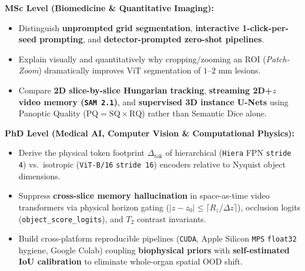 \documentclass[10.5pt,a4paper]{article}
\begin{document}
\begin{infobox}
\textbf{MSc Level (Biomedicine \& Quantitative Imaging):}
\begin{itemize}
    \item Distinguish \textbf{unprompted grid segmentation}, \textbf{interactive 1-click-per-seed prompting}, and \textbf{detector-prompted zero-shot pipelines}.
    \item Explain visually and quantitatively why cropping/zooming an ROI (\emph{Patch-Zoom}) dramatically improves ViT segmentation of $1\text{--}2\text{ mm}$ lesions.
    \item Compare \textbf{2D slice-by-slice Hungarian tracking}, \textbf{streaming 2D+$z$ video memory (\texttt{SAM 2.1})}, and \textbf{supervised 3D instance U-Nets} using Panoptic Quality ($\text{PQ} = \text{SQ} \times \text{RQ}$) rather than Semantic Dice alone.
\end{itemize}
\textbf{PhD Level (Medical AI, Computer Vision \& Computational Physics):}
\begin{itemize}
    \item Derive the physical token footprint $\Delta_{\text{tok}}$ of hierarchical (\texttt{Hiera} FPN \texttt{stride 4}) vs.\ isotropic (\texttt{ViT-B/16} \texttt{stride 16}) encoders relative to Nyquist object dimensions.
    \item Suppress \textbf{cross-slice memory hallucination} in space-as-time video transformers via physical horizon gating ($\lvert z - z_0 \rvert \le \lceil R_z / \Delta z \rceil$), occlusion logits (\texttt{object\_score\_logits}), and $T_2$ contrast invariants.
    \item Build cross-platform reproducible pipelines (\texttt{CUDA}, Apple Silicon \texttt{MPS} \texttt{float32} hygiene, Google Colab) coupling \textbf{biophysical priors} with \textbf{self-estimated IoU calibration} to eliminate whole-organ spatial OOD shift.
\end{itemize}
\end{infobox}
\end{document}
